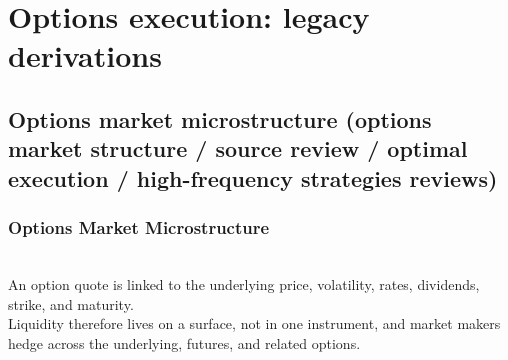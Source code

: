 \documentclass[a4paper,oneside,openany]{book}
\begin{document}
\chapter*{Options execution: legacy derivations}

\section*{Options market microstructure (options market structure / source review / optimal execution / high-frequency strategies reviews)}

\subsection*{Options Market Microstructure}

\begin{principle} \\
An option quote is linked to the underlying price, volatility, rates, dividends, strike, and maturity.\\
Liquidity therefore lives on a surface, not in one instrument, and market makers hedge across the underlying, futures, and related options.
\end{principle}
\end{document}
